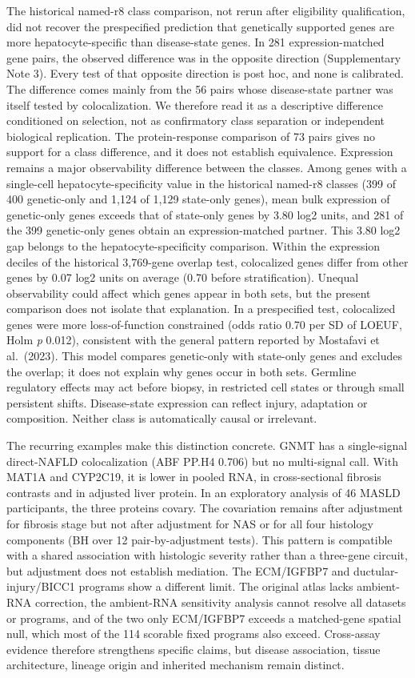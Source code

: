 The historical named-r8 class comparison, not rerun after eligibility qualification, did not recover the prespecified prediction that
genetically supported genes are more hepatocyte-specific than disease-state
genes. In 281 expression-matched gene pairs, the observed difference was in the
opposite direction (Supplementary Note 3). Every test of that opposite direction
is post hoc, and none is calibrated. The difference comes mainly from the 56
pairs whose disease-state partner was itself tested by colocalization. We
therefore read it as a descriptive difference conditioned on selection, not as
confirmatory class separation or independent biological replication. The
protein-response comparison of 73 pairs gives no support for a class difference,
and it does not establish equivalence. Expression remains a major observability
difference between the classes. Among genes with a single-cell hepatocyte-specificity
value in the historical named-r8 classes (399 of 400 genetic-only and 1,124 of 1,129 state-only genes),
mean bulk expression of genetic-only genes exceeds that of state-only genes by
3.80 log2 units, and 281 of the 399 genetic-only genes obtain an
expression-matched partner. This 3.80 log2 gap belongs to the
hepatocyte-specificity comparison. Within the expression deciles of the
historical 3,769-gene overlap test, colocalized genes differ from other genes by 0.07 log2
units on average (0.70 before stratification). Unequal observability could affect which genes
appear in both sets, but the present comparison does not isolate that
explanation. In a prespecified test, colocalized genes were more
loss-of-function constrained (odds ratio 0.70 per SD of LOEUF, Holm \emph{p} 0.012),
consistent with the general pattern reported by Mostafavi et al.~(2023).
This model compares genetic-only with state-only genes and excludes the overlap;
it does not explain why genes occur in both sets. Germline regulatory effects may act before biopsy, in restricted
cell states or through small persistent shifts. Disease-state expression can
reflect injury, adaptation or composition. Neither class is automatically causal
or irrelevant.

The recurring examples make this distinction concrete. GNMT has a single-signal
direct-NAFLD colocalization (ABF PP.H4 0.706) but no multi-signal call. With
MAT1A and CYP2C19, it is lower in pooled RNA, in cross-sectional fibrosis
contrasts and in adjusted liver protein. In an exploratory analysis of 46 MASLD
participants, the three proteins covary. The covariation remains after
adjustment for fibrosis stage but not after adjustment for NAS or for all four
histology components (BH over 12 pair-by-adjustment tests). This pattern is
compatible with a shared association with histologic severity rather than a
three-gene circuit, but adjustment does not establish mediation. The ECM/IGFBP7 and ductular-injury/BICC1
programs show a different limit. The original atlas lacks ambient-RNA
correction, the ambient-RNA sensitivity analysis cannot resolve all datasets or
programs, and of the two only ECM/IGFBP7 exceeds a matched-gene spatial null,
which most of the 114 scorable fixed programs also exceed. Cross-assay
evidence therefore strengthens specific claims, but disease association, tissue
architecture, lineage origin and inherited mechanism remain distinct.

